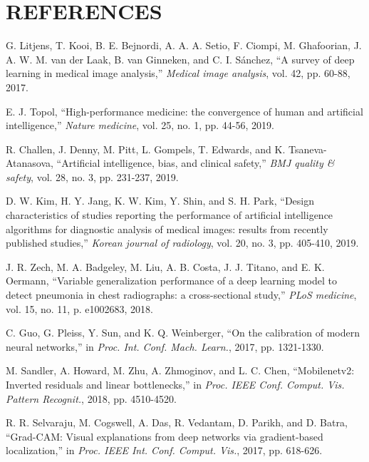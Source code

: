 \documentclass[conference]{IEEEtran}
\begin{document}
\section{REFERENCES}

\begin{thebibliography}{1}

G. Litjens, T. Kooi, B. E. Bejnordi, A. A. A. Setio, F. Ciompi, M. Ghafoorian, J. A. W. M. van der Laak, B. van Ginneken, and C. I. Sánchez, ``A survey of deep learning in medical image analysis,'' \textit{Medical image analysis}, vol. 42, pp. 60-88, 2017.

E. J. Topol, ``High-performance medicine: the convergence of human and artificial intelligence,'' \textit{Nature medicine}, vol. 25, no. 1, pp. 44-56, 2019.

R. Challen, J. Denny, M. Pitt, L. Gompels, T. Edwards, and K. Tsaneva-Atanasova, ``Artificial intelligence, bias, and clinical safety,'' \textit{BMJ quality \& safety}, vol. 28, no. 3, pp. 231-237, 2019.

D. W. Kim, H. Y. Jang, K. W. Kim, Y. Shin, and S. H. Park, ``Design characteristics of studies reporting the performance of artificial intelligence algorithms for diagnostic analysis of medical images: results from recently published studies,'' \textit{Korean journal of radiology}, vol. 20, no. 3, pp. 405-410, 2019.

J. R. Zech, M. A. Badgeley, M. Liu, A. B. Costa, J. J. Titano, and E. K. Oermann, ``Variable generalization performance of a deep learning model to detect pneumonia in chest radiographs: a cross-sectional study,'' \textit{PLoS medicine}, vol. 15, no. 11, p. e1002683, 2018.

C. Guo, G. Pleiss, Y. Sun, and K. Q. Weinberger, ``On the calibration of modern neural networks,'' in \textit{Proc. Int. Conf. Mach. Learn.}, 2017, pp. 1321-1330.

M. Sandler, A. Howard, M. Zhu, A. Zhmoginov, and L. C. Chen, ``Mobilenetv2: Inverted residuals and linear bottlenecks,'' in \textit{Proc. IEEE Conf. Comput. Vis. Pattern Recognit.}, 2018, pp. 4510-4520.

R. R. Selvaraju, M. Cogswell, A. Das, R. Vedantam, D. Parikh, and D. Batra, ``Grad-CAM: Visual explanations from deep networks via gradient-based localization,'' in \textit{Proc. IEEE Int. Conf. Comput. Vis.}, 2017, pp. 618-626.


\end{thebibliography}
\end{document}
